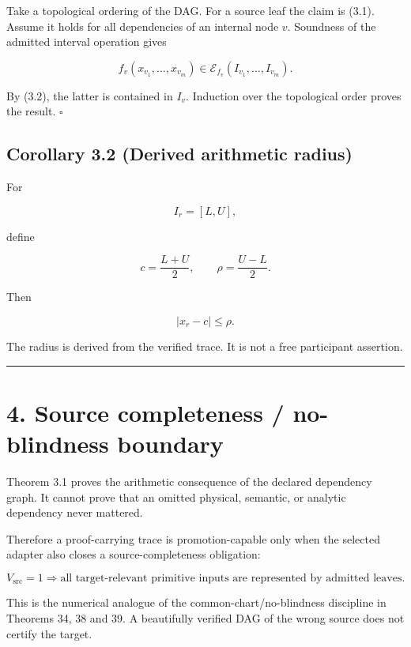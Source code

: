 Take a topological ordering of the DAG. For a source leaf the claim is (3.1). Assume it holds for all dependencies of an internal node \(v\). Soundness of the admitted interval operation gives

\[
f_v(x_{v_1},\ldots,x_{v_m})
\in
\mathcal E_{f_v}(I_{v_1},\ldots,I_{v_m}).
\]

By (3.2), the latter is contained in \(I_v\). Induction over the topological order proves the result. \(\square\)

\hypertarget{corollary-3.2-derived-arithmetic-radius}{%
\subsection{Corollary 3.2 (Derived arithmetic radius)}\label{corollary-3.2-derived-arithmetic-radius}}

For

\[
I_r=[L,U],
\]

define

\[
c=\frac{L+U}{2},
\qquad
\rho=\frac{U-L}{2}.
\]

Then

\[
\boxed{|x_r-c|\le\rho.}
\tag{3.4}
\]

The radius is derived from the verified trace. It is not a free participant assertion.

\begin{center}\rule{0.5\linewidth}{0.5pt}\end{center}

\hypertarget{source-completeness-no-blindness-boundary}{%
\section{4. Source completeness / no-blindness boundary}\label{source-completeness-no-blindness-boundary}}

Theorem 3.1 proves the arithmetic consequence of the declared dependency graph. It cannot prove that an omitted physical, semantic, or analytic dependency never mattered.

Therefore a proof-carrying trace is promotion-capable only when the selected adapter also closes a source-completeness obligation:

\[
\boxed{
V_{\mathrm{src}}=1
\Longrightarrow
\text{all target-relevant primitive inputs are represented by admitted leaves.}
}
\tag{4.1}
\]

This is the numerical analogue of the common-chart/no-blindness discipline in Theorems 34, 38 and 39. A beautifully verified DAG of the wrong source does not certify the target.

